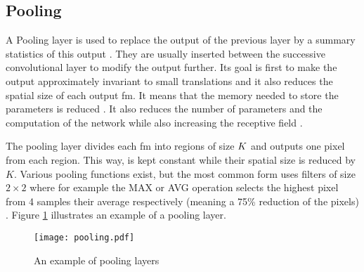 \subsection{Pooling} \label{subs:pooling}
A Pooling layer is used to replace the output of the previous layer by a summary statistics of this output \cite{goodfellow_deep_2016}. They are usually inserted between the successive convolutional layer to modify the output further. Its goal is first to make the output approximately invariant to small translations and it also reduces the spatial size of each output \acrshort{fm}. It means that the memory needed to store the parameters is reduced \cite{goodfellow_deep_2016}. It also reduces the number of parameters and the computation of the network while also increasing the receptive field \cite{shawahna_fpga-based_2019}.

The pooling layer divides each \acrshort{fm} into regions of size $K \title K$ and outputs one pixel from each region. This way, is kept constant while their spatial size is reduced by $K$. Various pooling functions exist, but the most common form uses filters of size $2 \times 2$ where for example the MAX or AVG operation selects the highest pixel from 4 samples their average respectively (meaning a 75\% reduction of the pixels) \cite{suda_throughput-optimized_2016}. Figure \ref{fig:pool} illustrates an example of a pooling layer.
%
\begin{figure}
    \centering
    \texttt{[image: pooling.pdf]}
    \caption{An example of pooling layers}
    \label{fig:pool}
\end{figure}
